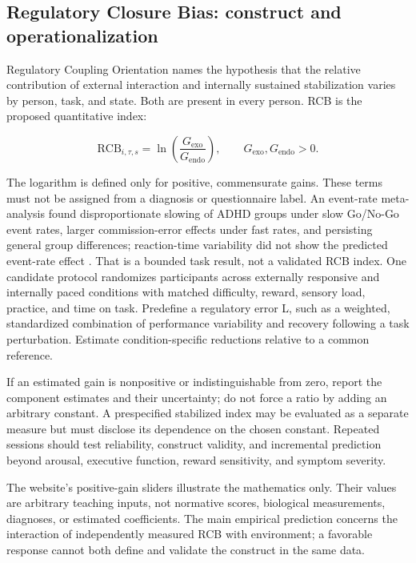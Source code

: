 \subsection{Regulatory Closure Bias: construct and operationalization}

Regulatory Coupling Orientation names the hypothesis that the relative contribution of external interaction and internally sustained stabilization varies by person, task, and state. Both are present in every person. RCB is the proposed quantitative index:

\begin{equation}
\mathrm{RCB}_{i,\tau,s}=\ln\!\left(\frac{G_{\mathrm{exo}}}{G_{\mathrm{endo}}}\right),
\qquad G_{\mathrm{exo}},G_{\mathrm{endo}}>0 .
\end{equation}

The logarithm is defined only for positive, commensurate gains. These terms must not be assigned from a diagnosis or questionnaire label. An event-rate meta-analysis found disproportionate slowing of ADHD groups under slow Go/No-Go event rates, larger commission-error effects under fast rates, and persisting general group differences; reaction-time variability did not show the predicted event-rate effect \cite{ref27}. That is a bounded task result, not a validated RCB index. One candidate protocol randomizes participants across externally responsive and internally paced conditions with matched difficulty, reward, sensory load, practice, and time on task. Predefine a regulatory error L, such as a weighted, standardized combination of performance variability and recovery following a task perturbation. Estimate condition-specific reductions relative to a common reference.

If an estimated gain is nonpositive or indistinguishable from zero, report the component estimates and their uncertainty; do not force a ratio by adding an arbitrary constant. A prespecified stabilized index may be evaluated as a separate measure but must disclose its dependence on the chosen constant. Repeated sessions should test reliability, construct validity, and incremental prediction beyond arousal, executive function, reward sensitivity, and symptom severity.

The website's positive-gain sliders illustrate the mathematics only. Their values are arbitrary teaching inputs, not normative scores, biological measurements, diagnoses, or estimated coefficients. The main empirical prediction concerns the interaction of independently measured RCB with environment; a favorable response cannot both define and validate the construct in the same data.


